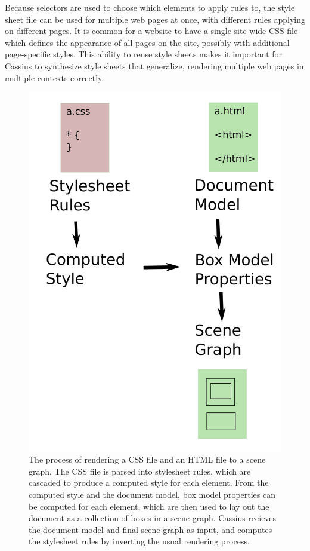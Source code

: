 \documentclass[10pt]{sigplanconf}
\newcommand{\name}{Cassius\xspace}
\begin{document}
Because selectors are used to choose which elements to apply rules to,
  the style sheet file can be used for multiple web pages at once,
  with different rules applying on different pages.
It is common for a website to have a single site-wide CSS file
  which defines the appearance of all pages on the site,
  possibly with additional page-specific styles.
This ability to reuse style sheets makes it important
  for \name to synthesize style sheets that generalize,
  rendering multiple web pages in multiple contexts correctly.
  
\begin{figure}[tbhp]
  \includegraphics[width=\linewidth]{diagram.png}
  \caption{The process of rendering a CSS file and an HTML file
    to a scene graph. The CSS file is parsed into stylesheet rules,
    which are cascaded to produce a computed style for each element.
    From the computed style and the document model,
    box model properties can be computed for each element,
    which are then used to lay out the document as a collection
    of boxes in a scene graph.
    \name recieves the document model and final scene graph as input,
    and computes the stylesheet rules by inverting the usual rendering process.}
\end{figure}
\end{document}
